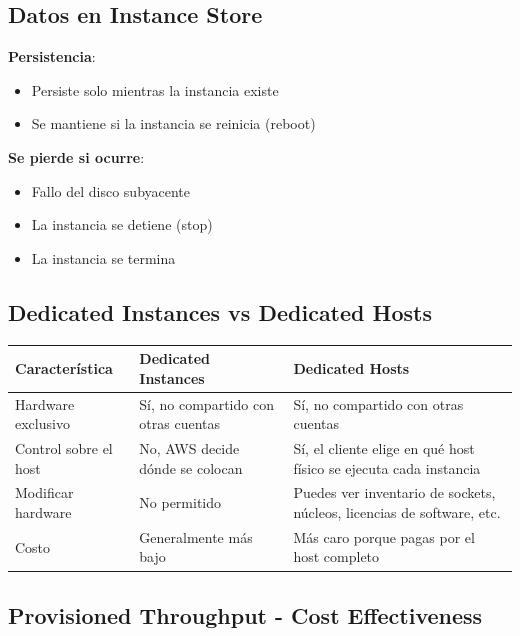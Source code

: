 \documentclass[12pt,a4paper]{report}
\begin{document}
\subsection{Datos en Instance Store}

\textbf{Persistencia}:
\begin{itemize}
    \item Persiste solo mientras la instancia existe
    \item Se mantiene si la instancia se reinicia (reboot)
\end{itemize}

\textbf{Se pierde si ocurre}:
\begin{itemize}
    \item Fallo del disco subyacente
    \item La instancia se detiene (stop)
    \item La instancia se termina
\end{itemize}

\subsection{Dedicated Instances vs Dedicated Hosts}

\begin{center}
\begin{longtable}{|p{4cm}|p{5cm}|p{5cm}|}
\hline
\cellcolor{awsblue!20}\textbf{Característica} & \cellcolor{awsblue!20}\textbf{Dedicated Instances} & \cellcolor{awsblue!20}\textbf{Dedicated Hosts} \\
\hline
Hardware exclusivo & Sí, no compartido con otras cuentas & Sí, no compartido con otras cuentas \\
\hline
Control sobre el host & No, AWS decide dónde se colocan & Sí, el cliente elige en qué host físico se ejecuta cada instancia \\
\hline
Modificar hardware & No permitido & Puedes ver inventario de sockets, núcleos, licencias de software, etc. \\
\hline
Costo & Generalmente más bajo & Más caro porque pagas por el host completo \\
\hline
\end{longtable}
\end{center}

\subsection{Provisioned Throughput - Cost Effectiveness}
\end{document}
